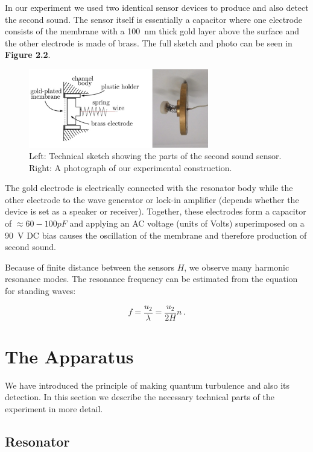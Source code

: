 In our experiment we used two identical sensor devices to produce and also detect the second sound. The sensor itself is essentially a capacitor where one electrode consists of the membrane with a 100~nm thick gold layer above the surface and the other electrode is made of brass. The full sketch and photo can be seen in {\sffamily\textbf{Figure 2.2}}.

\begin{figure}[h]
	\centering
	\includegraphics[width=0.7\textwidth]{graphics/SSpic}
	\caption{Left: Technical sketch showing the parts of the second sound sensor. Right: A photograph of our experimental construction.}
\end{figure}

The gold electrode is electrically connected with the resonator body while the other electrode to the wave generator or lock-in amplifier (depends whether the device is set as a speaker or receiver). Together, these electrodes form a capacitor of $\approx 60-100\unit{pF}$ and applying an AC voltage (units of Volts) superimposed on a 90~V DC bias causes the oscillation of the membrane and therefore production of second sound.

Because of finite distance between the sensors $ H $, we observe many harmonic resonance modes. The resonance frequency can be estimated from the equation for standing waves:

\begin{equation}
f = \frac{u_2}{\lambda} = \frac{u_2}{2H}n\,.
\label{SSresonance}
\end{equation}

\newpage

\section{The Apparatus}

We have introduced the principle of making quantum turbulence and also its detection. In this section we describe the necessary technical parts of the experiment in more detail.

\subsection*{Resonator}

